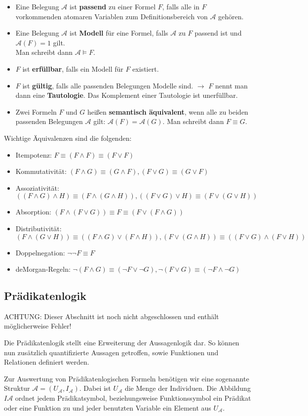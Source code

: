 \begin{itemize}
	\item Eine Belegung $\mathcal A$ ist \textbf{passend} zu einer  Formel $F$, falls alle in $F$ vorkommenden atomaren Variablen zum Definitionsbereich von $\mathcal A$ gehören.
	\item Eine Belegung $\mathcal A$ ist \textbf{Modell} für eine Formel, falls $\mathcal A$ zu $F$ passend ist und $\mathcal A(F)=1$ gilt.\\
			Man schreibt dann $\mathcal A \vDash F$.
	\item $F$ ist \textbf{erfüllbar}, falls ein Modell für $F$ existiert.
	\item $F$ ist \textbf{gültig}, falls alle passenden Belegungen Modelle sind. $\rightarrow$ $F$ nennt man dann eine  \textbf{Tautologie}. Das Komplement einer Tautologie ist unerfüllbar.
	\item Zwei Formeln $F$ und $G$ heißen \textbf{semantisch äquivalent}, wenn alle zu beiden passenden Belegungen $\mathcal A$ gilt: $\mathcal A(F) = \mathcal A(G)$. Man schreibt dann $F\equiv G$.
\end{itemize}

\vspace{1em}

Wichtige Äquivalenzen sind die folgenden:
\begin{itemize}
	\item Itempotenz: $F\equiv (F\wedge F)\equiv (F\vee F)$
	\item Kommutativität: $(F\wedge G)\equiv (G\wedge F), (F\vee G)\equiv (G\vee F)$
	\item Assoziativität: $((F\wedge G)\wedge H)\equiv(F\wedge (G\wedge H)), ((F\vee G)\vee H)\equiv(F\vee (G\vee H))$
	\item Absorption: $(F\wedge (F\vee G))\equiv F \equiv (F\vee (F\wedge G))$
	\item Distributivität: $(F\wedge (G\vee H))\equiv ((F\wedge G)\vee (F\wedge H)), (F\vee (G\wedge H))\equiv ((F\vee G)\wedge (F\vee H))$
	\item Doppelnegation: $\neg\neg F \equiv F$
	\item deMorgan-Regeln: $\neg (F\wedge G)\equiv (\neg F\vee \neg G), \neg (F\vee G)\equiv (\neg F\wedge \neg G)$
\end{itemize}


\subsection{Prädikatenlogik}
{\color{red}ACHTUNG: Dieser Abschnitt ist noch nicht abgeschlossen und enthält möglicherweise Fehler!}

Die Prädikatenlogik stellt eine Erweiterung der Aussagenlogik dar. So können nun zusätzlich quantifizierte Aussagen getroffen, sowie Funktionen und Relationen definiert werden.


Zur Auswertung von Prädikatenlogischen Formeln benötigen wir eine sogenannte Struktur $\mathcal A=(U_{\mathcal A}, I_{\mathcal A})$. Dabei ist $U_{\mathcal A}$ die Menge der Individuen. Die Abbildung $I{\mathcal A}$ ordnet jedem Prädikatsymbol, beziehungsweise Funktionssymbol ein Prädikat oder eine Funktion zu und jeder benutzten Variable ein Element aus $U_{\mathcal A}$.


